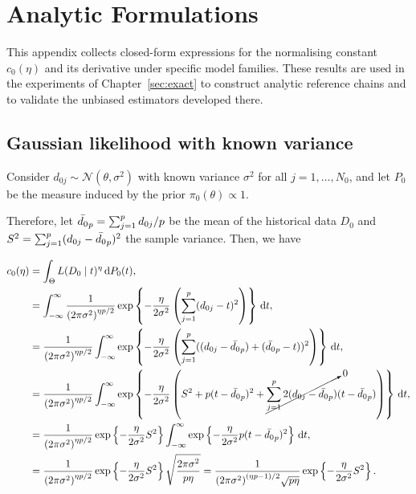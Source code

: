 \chapter{Analytic Formulations}
\label{chap:formulations}

This appendix collects closed-form expressions for the normalising constant $c_0(\eta)$ and its derivative under specific model families.
These results are used in the experiments of Chapter~\ref{sec:exact} to construct analytic reference chains and to validate the unbiased estimators developed there.

\section{Gaussian likelihood with known variance}
\label{sec:gaussian-known-var}

Consider $d_{0j} \sim \mathcal{N}(\theta, \sigma^2)$ with known variance $\sigma^2$ for all $j = 1,\ldots, N_0$, and let $P_0$ be the measure induced by the prior $\pi_0(\theta) \propto 1$.

Therefore, let $\bar{d_0}_p = \sum_{j=1}^{p} d_{0j}/p$ be the mean of the historical data $D_0$ and $S^2 = \sum_{j=1}^{p} (d_{0j} - \bar{d_0}_p)^2$ the sample variance. Then, we have

\begin{align*}
    c_0(\eta) &= \int_{\Theta} L(D_0 \mid t)^{\eta}\,  \dd P_0(t), \\
    &= \int_{-\infty}^{\infty} \dfrac{1}{{(2\pi\sigma^2)}^{\eta p/2}} \exp\left\{-\dfrac{\eta}{2\sigma^2}\left(\sum_{j=1}^{p}(d_{0j} - t)^2\right) \right\} \, \dd t, \\
    &= \dfrac{1}{{(2\pi\sigma^2)}^{\eta p/2}}\int_{-\infty}^{\infty}  \exp\left\{-\dfrac{\eta}{2\sigma^2}\left(\sum_{j=1}^{p}((d_{0j} -\bar{d_0}_p) + (\bar{d_0}_p - t))^2\right) \right\} \, \dd t, \\
    &=  \dfrac{1}{{(2\pi\sigma^2)}^{\eta p/2}}\int_{-\infty}^{\infty} \exp\left\{-\dfrac{\eta}{2\sigma^2}\left(S^2 + p(t- \bar{d_0}_p)^2 + \cancelto{0}{\sum_{j=1}^{p} 2(d_{0j} - \bar{d_0}_p)}(t- \bar{d_0}_p)\right) \right\} \, \dd t, \\
    &= \dfrac{1}{{(2\pi\sigma^2)}^{\eta p/2}}\exp\left\{-\dfrac{\eta}{2\sigma^2}S^2\right\} \int_{-\infty}^{\infty} \exp\left\{-\dfrac{\eta}{2\sigma^2}p(t- \bar{d_0}_p)^2  \right\} \, \dd t, \\
    &= \dfrac{1}{{(2\pi\sigma^2)}^{\eta p/2}}\exp\left\{-\dfrac{\eta}{2\sigma^2}S^2\right\} \sqrt{\dfrac{2\pi\sigma^2}{p\eta}} = \dfrac{1}{{(2\pi\sigma^2)}^{(\eta p - 1)/2}\sqrt{p\eta}}\exp\left\{-\dfrac{\eta}{2\sigma^2}S^2\right\}.
\end{align*}

